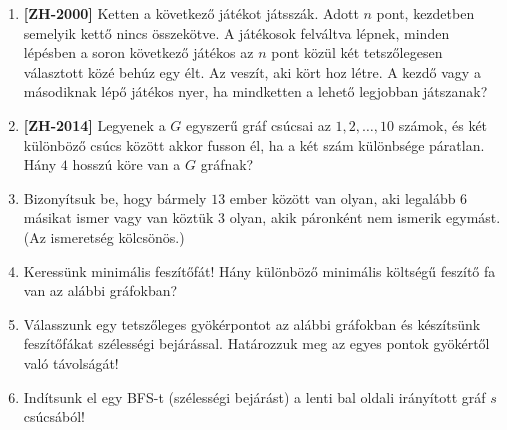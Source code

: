 \documentclass[a4paper,12pt]{article}
\begin{document}
\begin{enumerate}
        \item \textbf{[ZH-2000]} Ketten a következő játékot játsszák. Adott $n$ pont, kezdetben semelyik kettő nincs összekötve. A játékosok felváltva lépnek, minden lépésben a soron következő játékos az $n$ pont közül két tetszőlegesen választott közé behúz egy élt. Az veszít, aki kört hoz létre. A kezdő vagy a másodiknak lépő játékos nyer, ha mindketten a lehető legjobban játszanak?

        \item \textbf{[ZH-2014]} Legyenek a $G$ egyszerű gráf csúcsai az $1,2,\ldots,10$ számok, és két különböző csúcs között akkor fusson él, ha a két szám különbsége páratlan. Hány $4$ hosszú köre van a $G$ gráfnak?
        
        \item Bizonyítsuk be, hogy bármely $13$ ember között van olyan, aki legalább $6$ másikat ismer vagy van köztük $3$ olyan, akik páronként nem ismerik egymást. (Az ismeretség kölcsönös.)
        
        \item Keressünk minimális feszítőfát! Hány különböző minimális költségű feszítő fa van az alábbi gráfokban?
        \begin{figure}[!h]
            \centering
            \hfill
             \hfill
             \hfill
             \hfill
        \end{figure}

        \item Válasszunk egy tetszőleges gyökérpontot az alábbi gráfokban és készítsünk feszítőfákat szélességi bejárással. Határozzuk meg az egyes pontok gyökértől való távolságát!
        \begin{figure}[h]
            \centering
             \hspace{1in}
            
        \end{figure}

        \item Indítsunk el egy BFS-t (szélességi bejárást) a lenti bal oldali irányított gráf $s$ csúcsából!
        \begin{figure}[h]
            \centering
             \hspace{1in}
            
        \end{figure}


\end{enumerate}
\end{document}
